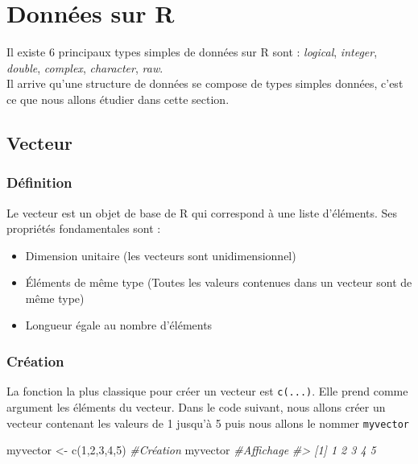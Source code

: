 \documentclass[
]{book}
\newenvironment{Shaded}{\begin{snugshade}}{\end{snugshade}}
\newcommand{\CommentTok}[1]{\textcolor[rgb]{0.56,0.35,0.01}{\textit{#1}}}
\newcommand{\DecValTok}[1]{\textcolor[rgb]{0.00,0.00,0.81}{#1}}
\newcommand{\FunctionTok}[1]{\textcolor[rgb]{0.00,0.00,0.00}{#1}}
\newcommand{\NormalTok}[1]{#1}
\newcommand{\OtherTok}[1]{\textcolor[rgb]{0.56,0.35,0.01}{#1}}
\providecommand{\tightlist}{%
  \setlength{\itemsep}{0pt}\setlength{\parskip}{0pt}}
\begin{document}
\hypertarget{data-R}{%
\section{Données sur R}\label{data-R}}

Il existe 6 principaux types simples de données sur R sont : \emph{logical}, \emph{integer}, \emph{double}, \emph{complex}, \emph{character}, \emph{raw}.\\
Il arrive qu'une structure de données se compose de types simples données, c'est ce que nous allons étudier dans cette section.

\hypertarget{vecteur}{%
\subsection{Vecteur}\label{vecteur}}

\hypertarget{duxe9finition}{%
\subsubsection*{Définition}\label{duxe9finition}}

Le vecteur est un objet de base de R qui correspond à une liste d'éléments. Ses propriétés fondamentales sont :

\begin{itemize}
\tightlist
\item
  Dimension unitaire (les vecteurs sont unidimensionnel)\\
\item
  Éléments de même type (Toutes les valeurs contenues dans un vecteur sont de même type)\\
\item
  Longueur égale au nombre d'éléments
\end{itemize}

\hypertarget{cruxe9ation}{%
\subsubsection*{Création}\label{cruxe9ation}}

La fonction la plus classique pour créer un vecteur est \texttt{c(...)}. Elle prend comme argument les éléments du vecteur. Dans le code suivant, nous allons créer un vecteur contenant les valeurs de 1 jusqu'à 5 puis nous allons le nommer \texttt{myvector}

\begin{Shaded}
\begin{Highlighting}[]
\NormalTok{myvector }\OtherTok{\textless{}{-}} \FunctionTok{c}\NormalTok{(}\DecValTok{1}\NormalTok{,}\DecValTok{2}\NormalTok{,}\DecValTok{3}\NormalTok{,}\DecValTok{4}\NormalTok{,}\DecValTok{5}\NormalTok{) }\CommentTok{\#Création}
\NormalTok{myvector }\CommentTok{\#Affichage}
\CommentTok{\#\textgreater{} [1] 1 2 3 4 5}
\end{Highlighting}
\end{Shaded}
\end{document}
